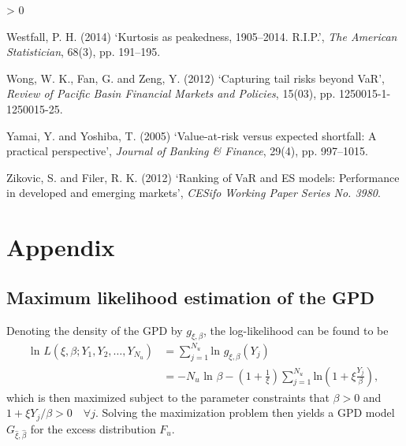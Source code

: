 \documentclass[a4paper,11pt]{article}
\newlength{\cslhangindent}
\newenvironment{CSLReferences}[2] %
 {%
  \setlength{\parindent}{0pt}
  \ifodd #1 \everypar{\setlength{\hangindent}{\cslhangindent}}\ignorespaces\fi
  \ifnum #2 > 0
  \setlength{\parskip}{#2\baselineskip}
  \fi
 }%
 {}
\theoremstyle{definition}
\theoremstyle{definition}
\theoremstyle{definition}
\theoremstyle{definition}
\theoremstyle{remark}
\begin{document}
\begin{CSLReferences}{0}{0}
\leavevmode\hypertarget{ref-westfall2014kurtosis}{}%
Westfall, P. H. (2014) {`Kurtosis as peakedness, 1905--2014. {R.I.P.}'}, \emph{The American Statistician}, 68(3), pp. 191--195.

\leavevmode\hypertarget{ref-wong2012capturing}{}%
Wong, W. K., Fan, G. and Zeng, Y. (2012) {`Capturing tail risks beyond VaR'}, \emph{Review of Pacific Basin Financial Markets and Policies}, 15(03), pp. 1250015-1-1250015-25.

\leavevmode\hypertarget{ref-yamai2005value}{}%
Yamai, Y. and Yoshiba, T. (2005) {`Value-at-risk versus expected shortfall: A practical perspective'}, \emph{Journal of Banking \& Finance}, 29(4), pp. 997--1015.

\leavevmode\hypertarget{ref-zikovic2012ranking}{}%
Zikovic, S. and Filer, R. K. (2012) {`Ranking of VaR and ES models: Performance in developed and emerging markets'}, \emph{CESifo Working Paper Series No. 3980}.

\end{CSLReferences}
\indent
\setlength{\parindent}{17pt}
\setlength{\leftskip}{0pt}
\setlength{\parskip}{0pt}

\newpage

\appendix

\hypertarget{appendix}{%
\section{Appendix}\label{appendix}}

\hypertarget{sec:mle}{%
\subsection{Maximum likelihood estimation of the GPD}\label{sec:mle}}

Denoting the density of the GPD by \(g_{\xi, \beta}\), the log-likelihood can be found to be
\begin{equation}
\begin{aligned}
\text{ln }L(\xi, \beta; Y_1, Y_2, \dots, Y_{N_u}) &= \sum_{j=1}^{N_u}\text{ln }g_{\xi, \beta}(Y_j)\ \\
& = -N_u \text{ ln }\beta - \left(1 + \frac{1}{\xi}\right) \sum_{j=1}^{N_u}\text{ln}\left(1 + \xi \frac{Y_j}{\beta}\right),
\end{aligned}
\label{eq:loglikGPD}
\end{equation}
which is then maximized subject to the parameter constraints that \(\beta > 0\) and \(1 + \xi Y_j / \beta > 0 \quad \forall j\). Solving the maximization problem then yields a GPD model \(G_{\hat \xi, \hat \beta}\) for the excess distribution \(F_u\).
\end{document}
